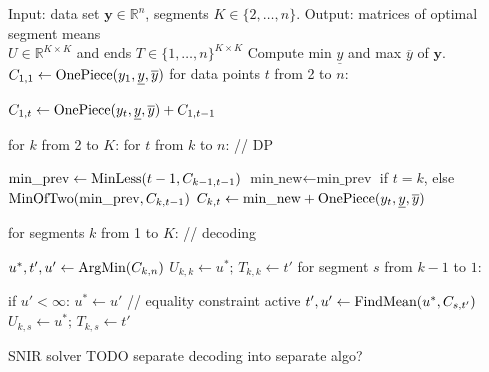 \documentclass{article}
\newcommand{\RR}{\mathbb R}
\begin{document}
\begin{algorithm}[H]
\begin{algorithmic}[1]
\STATE Input: data set $\mathbf y\in\RR^n$, segments $K\in\{2,\dots, n\}$.
\STATE Output: matrices of optimal segment means\\ $U\in\RR^{K\times K}$ 
and ends $T\in\{1,\dots,n\}^{K\times K}$
\STATE Compute min $\underline y$ and max $\overline y$ of $\mathbf y$.
\label{line:min-max}
\STATE $C_{1,1}\gets \text{OnePiece}(y_1, \underline y, \overline y)$
\label{line:init-1}
\STATE for data points $t$ from 2 to $n$:
\begin{ALC@g}
  \STATE $C_{1,t}\gets \text{OnePiece}(y_t, \underline y, \overline y) + C_{1,t-1}$
\label{line:init-t}
\end{ALC@g}
\STATE for $k$ from 2 to $K$: for $t$ from $k$ to $n$: // DP
\label{line:for-k-t}
\begin{ALC@g}
  \STATE $\text{min\_prev}\gets \text{MinLess}(t-1, C_{k-1,t-1})$ 
  \label{line:MinLess}
    \STATE $\text{min\_new}\gets\text{min\_prev}$ if $t=k$, 
else $\text{MinOfTwo}(\text{min\_prev}, C_{k, t-1})$
  \label{line:MinOfTwo}
  \STATE $C_{k,t}\gets \text{min\_new} + \text{OnePiece}(y_t, \underline y, \overline y)$
  \label{line:AddNew}
\end{ALC@g}
\STATE for segments $k$ from 1 to $K$: // decoding
\label{line:for-k-decoding}
\begin{ALC@g}
  \STATE $u^*,t',u'\gets \text{ArgMin}(C_{k,n})$
  \label{line:ArgMin}
  \STATE $U_{k,k}\gets u^*;\, T_{k,k}\gets t'$ 
  \label{line:decode-kk}
  \STATE for segment $s$ from $k-1$ to $1$: 
  \label{line:for-s-decoding}
  \begin{ALC@g}
    \STATE if $u' < \infty$: $u^*\gets u'$ // equality constraint active
    \label{line:equality-constraint-active}
    \STATE $t',u'\gets\text{FindMean}(u^*, C_{s,t'})$
    \label{line:FindMean}
    \STATE $U_{k,s}\gets u^*;\, T_{k,s}\gets t'$ 
    \label{line:decode-ks}
  \end{ALC@g}
\end{ALC@g}
\caption{\label{algo:SNIR} SNIR solver TODO separate decoding into separate algo?}
\end{algorithmic}
\end{algorithm}
\end{document}
